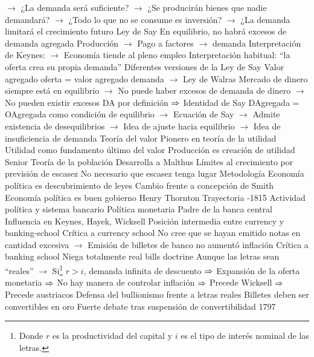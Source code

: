\documentclass{nuevotema}
\begin{document}
\begin{esquemal}
				\4[] $\to$ ¿La demanda será suficiente?
				\4[] $\to$ ¿Se producirán bienes que nadie demandará?
				\4[] $\to$ ¿Todo lo que no se consume es inversión?
				\4[] $\to$ ¿La demanda limitará el crecimiento futuro
				\4 Ley de Say
				\4[] En equilibrio, no habrá excesos de demanda agregada
				\4[] Producción $\to$ Pago a factores $\to$ demanda
				\4[] Interpretación de Keynes:
				\4[] $\to$ Economía tiende al pleno empleo
				\4[] Interpretación habitual:
				\4[] ``la oferta crea su propia demanda''
				\4 Diferentes versiones de la Ley de Say
				\4[] Valor agregado oferta = valor agregado demanda
				\4[] $\to$ Ley de Walras
				\4[] Mercado de dinero siempre está en equilibrio
				\4[] $\to$ No puede haber excesos de demanda de dinero
				\4[] $\to$ No pueden existir excesos DA por definición
				\4[] $\Rightarrow$ Identidad de Say
				\4[] DAgregada = OAgregada como condición de equilibrio
				\4[] $\to$ Ecuación de Say
				\4[] $\to$ Admite existencia de desequilibrios
				\4[] $\to$ Idea de ajuste hacia equilibrio
				\4[] $\to$ Idea de insuficiencia de demanda
			\3 Teoría del valor
				\4 Pionero en teoría de la utilidad
				\4 Utilidad como fundamento último del valor
				\4 Producción es creación de utilidad
		\2 Senior
			\3 Teoría de la población
				\4 Desarrolla a Malthus
				\4 Límites al crecimiento por previsión de escasez
				\4[$\Rightarrow$] No necesario que escasez tenga lugar
			\3 Metodología
				\4 Economía política es descubrimiento de leyes
				\4 Cambio frente a concepción de Smith
				\4[] Economía política es buen gobierno
		\2 Henry Thornton
			\3 Trayectoria
				-1815
				\4 Actividad política y sistema bancario
			\3 Política monetaria
				\4 Padre de la banca central
				\4 Influencia en Keynes, Hayek, Wicksell
				\4 Posición intermedia entre currency y banking-school
				\4 Crítica a currency school
				\4[] No cree que se hayan emitido notas en cantidad excesiva
				\4[] $\to$ Emisión de billetes de banco no aumentó inflación
				\4 Crítica a banking school
				\4[] Niega totalmente real bills doctrine
				\4[] Aunque las letras sean ``reales''
				\4[] $\to$ Si\footnote{Donde $r$ es la productividad del capital y $i$ es el tipo de interés nominal de las letras.} $r>i$, demanda infinita de descuento
				\4[] $\Rightarrow$ Expansión de la oferta monetaria
				\4[] $\Rightarrow$ No hay manera de controlar inflación
				\4[] $\Rightarrow$ Precede Wicksell
				\4[] $\Rightarrow$ Precede austriacos
				\4 Defensa del bullionismo frente a letras reales
				\4[] Billetes deben ser convertibles en oro
				\4[] Fuerte debate tras suspensión de convertibilidad 1797

\end{esquemal}
\end{document}
